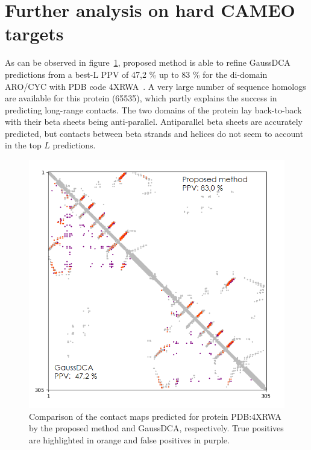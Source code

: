 \section{Further analysis on hard CAMEO targets}

    As can be observed in figure~\ref{analysis_4xrwa}, proposed method is able
    to refine GaussDCA predictions from a best-L PPV of 47,2 \% up to 83 \%
    for the di-domain ARO/CYC with PDB code 4XRWA~\cite{caldara2015structural}.
    A very large number of sequence homologs are available for this protein (65535),
    which partly explains the success in predicting long-range contacts.
    The two domains of the protein lay back-to-back with their
    beta sheets being anti-parallel.
    Antiparallel beta sheets are accurately predicted, but contacts between beta strands
    and helices do not seem to account in the top $L$ predictions.

    \begin{figure}[H]
        \begin{center}
            \includegraphics[width=\textwidth, keepaspectratio]{imgs/4XRWA.png}
            \caption{Comparison of the contact maps predicted for protein PDB:4XRWA
                by the proposed method and GaussDCA, respectively. True positives
                are highlighted in orange and false positives in purple.}
            \label{analysis_4xrwa}
        \end{center}
    \end{figure}

